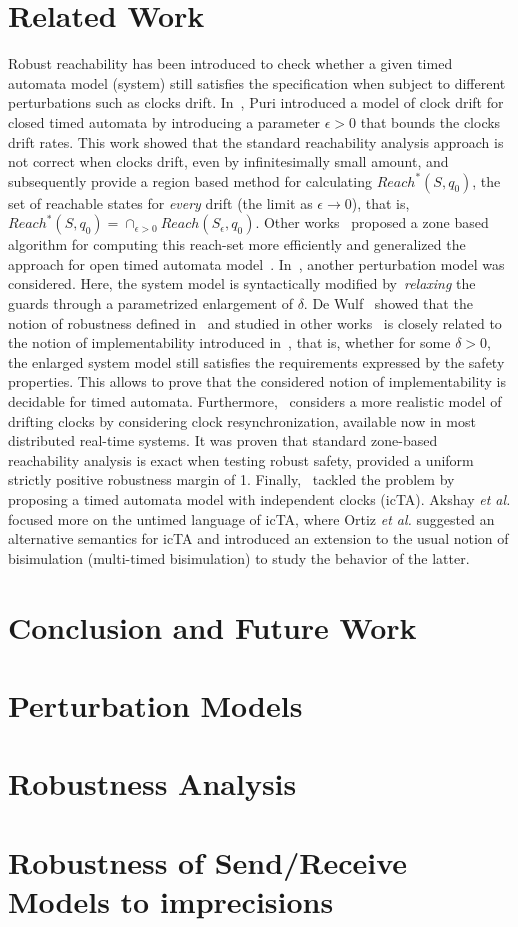 \section{Related Work}
\label{sec:5}
Robust reachability has been introduced to check whether a given
timed automata model (system) still satisfies the specification when
subject to different perturbations such as clocks drift.
In~\cite{drift:puri98}, Puri introduced a model of clock drift for closed timed automata
by introducing a parameter $\epsilon>0$ that bounds the clocks drift rates.
This work showed that the standard reachability analysis approach is not correct
when clocks drift, even by infinitesimally small amount, and subsequently provide a region based
method for calculating $Reach^*(S,q_0)$, the set of reachable states for \emph{every} drift 
(the limit as $\epsilon\to 0$),
that is, $Reach^*(S,q_0)=\cap_{\epsilon>0} Reach(S_{\epsilon},q_0)$.
Other works~\cite{drift:conrad,drift:puriR} proposed a zone based algorithm for computing
this reach-set more efficiently and generalized the approach for open timed automata 
model~\cite{drift:puriR}.
In~\cite{drift:wulf}, another perturbation model was considered. Here, 
the system model is syntactically modified by~\emph{relaxing} the guards through 
a parametrized  enlargement of $\delta$.
De Wulf~\cite{drift:wulf} showed that the notion of robustness defined in~\cite{drift:puri} and
studied in other works~\cite{drift:conrad, drift:puriR} is closely related to the notion of 
implementability introduced in~\cite{drift:wulf}, that is, whether for some $\delta>0$,
the enlarged system model still satisfies the requirements expressed by the safety properties.
This allows to prove that the considered notion of implementability is decidable 
for timed automata.
Furthermore,~\cite{drift:surp} considers a more realistic model of drifting clocks by considering
clock resynchronization, available now in most distributed real-time systems. It was proven
that standard zone-based reachability analysis  is exact when testing robust safety, provided
a uniform strictly positive robustness margin of 1.
Finally,~\cite{drift:akshay,drift:ortiz} tackled the problem by proposing a timed automata 
model with independent clocks (icTA). Akshay \emph{et al.} focused more on the 
untimed language of icTA, where Ortiz \emph{et al.} suggested an alternative semantics for icTA
and introduced an extension to the usual notion of bisimulation (multi-timed bisimulation) to
study the behavior of the latter. 
\section{Conclusion and Future Work}
\label{sec:6}
\section{Perturbation Models}
\section{Robustness Analysis}
\section{Robustness of Send/Receive Models to imprecisions}

